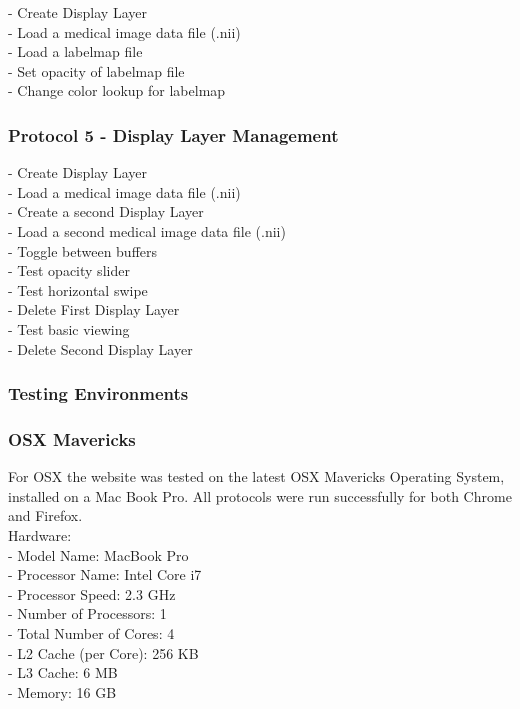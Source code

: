 \documentclass[a4paper,11pt,titlepage]{article}
\begin{document}
- Create Display Layer\\
- Load a medical image data file (.nii)\\
- Load a labelmap file\\
- Set opacity of labelmap file\\
- Change color lookup for labelmap

\subsubsection*{Protocol 5 - Display Layer Management }

- Create Display Layer\\
- Load a medical image data file (.nii)\\
- Create a second Display Layer\\
- Load a second medical image data file (.nii)\\
- Toggle between buffers\\
- Test opacity slider\\
- Test horizontal swipe\\
- Delete First Display Layer\\
- Test basic viewing\\
- Delete Second Display Layer




\subsubsection{Testing Environments}


\subsubsection*{OSX Mavericks}

For OSX the website was tested on the latest OSX Mavericks Operating System, installed on a Mac Book Pro. All protocols were run successfully for both Chrome and Firefox.\\

\noindent Hardware:\\
- Model Name:	MacBook Pro\\
- Processor Name:	Intel Core i7\\
- Processor Speed:	2.3 GHz\\
- Number of Processors:	1\\
- Total Number of Cores:	4\\
- L2 Cache (per Core):	256 KB\\
- L3 Cache:	6 MB\\
- Memory:	16 GB\\
\end{document}
